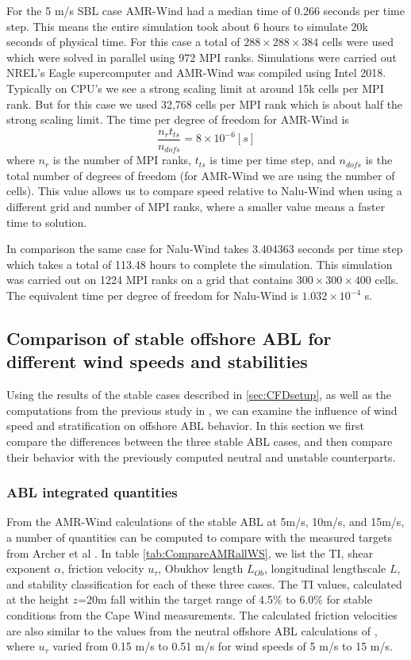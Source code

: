 For the 5 m/s SBL case AMR-Wind had a median time of 0.266 seconds per time step.
This means the entire simulation took about 6 hours to simulate 20k seconds
of physical time. For this case a total of $288\times 288 \times 384$ cells were used
which were solved in parallel using 972 MPI ranks. Simulations were carried out NREL's
Eagle supercomputer and AMR-Wind was compiled using Intel 2018.
Typically on CPU's we see a strong scaling limit at around 15k cells per MPI rank.
But for this case we used 32,768 cells per MPI rank which is about half the strong scaling limit.
The time per degree of freedom for AMR-Wind is
\[\frac{n_r t_{ts} }{n_{dofs}} = 8\times10^{-6} [s]\]
where $n_r$ is the number of MPI ranks, $t_{ts}$ is time per time step, and $n_{dofs}$ is
the total number of degrees of freedom (for AMR-Wind we are using the number of cells).
This value allows us to compare speed relative to Nalu-Wind when using a different
grid and number of MPI ranks, where a smaller value means a faster time to solution.

In comparison the same case for Nalu-Wind takes 3.404363 seconds per time step which
takes a total of 113.48 hours to complete the simulation. This simulation was carried out
on 1224 MPI ranks on a grid that contains $300\times 300 \times 400$ cells. The equivalent
time per degree of freedom for Nalu-Wind is $1.032 \times 10^{-4}$ s.

\subsection{Comparison of stable offshore ABL for different wind speeds and stabilities}

Using the results of the stable cases described in \ref{sec:CFDsetup},
as well as the computations from the previous study in
\cite{cheung2020large}, we can examine the influence of wind speed and
stratification on offshore ABL behavior.  In this section we first
compare the differences between the three stable ABL cases, and then
compare their behavior with the previously computed neutral and
unstable counterparts.

\subsubsection{\label{sec:stableABLStats} ABL integrated quantities}
From the AMR-Wind calculations of the stable ABL at 5m/s, 10m/s, and
15m/s, a number of quantities can be computed to compare with the
measured targets from Archer et al \cite{archer2016predominance}.  In
table \ref{tab:CompareAMRallWS}, we list the TI, shear exponent
$\alpha$, friction velocity $u_\tau$, Obukhov length $L_{Ob}$,
longitudinal lengthscale $L$, and stability classification for each of
these three cases.  The TI values, calculated at the height $z$=20m
fall within the target range of 4.5\% to 6.0\% for stable conditions
from the Cape Wind measurements.  The calculated friction velocities
are also similar to the values from the neutral offshore ABL
calculations of \cite{cheung2020large}, where $u_\tau$ varied from
0.15 m/s to 0.51 m/s for wind speeds of 5 m/s to 15 m/s.

